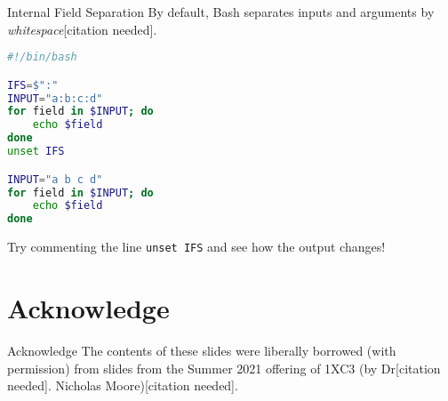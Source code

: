 \documentclass[11pt]{beamer}
\begin{document}
\begin{frame}[fragile=singleslide]{Internal Field Separation}
By default, Bash separates inputs and arguments by \emph{whitespace}[citation needed].
\begin{lstlisting}[style=terminal, language=bash]
#!/bin/bash

IFS=$":"
INPUT="a:b:c:d"
for field in $INPUT; do
    echo $field
done
unset IFS

INPUT="a b c d"
for field in $INPUT; do
    echo $field
done
\end{lstlisting}

Try commenting the line \texttt{unset IFS} and see how the output changes! 
\end{frame}


\section[Acknowledge]{Acknowledge}
\begin{frame}{Acknowledge}
\center
\vspace{8em}
The contents of these slides were liberally borrowed (with permission) from slides from the Summer 2021 offering of 1XC3 (by Dr[citation needed]. Nicholas Moore)[citation needed].  
\end{frame}
\end{document}
